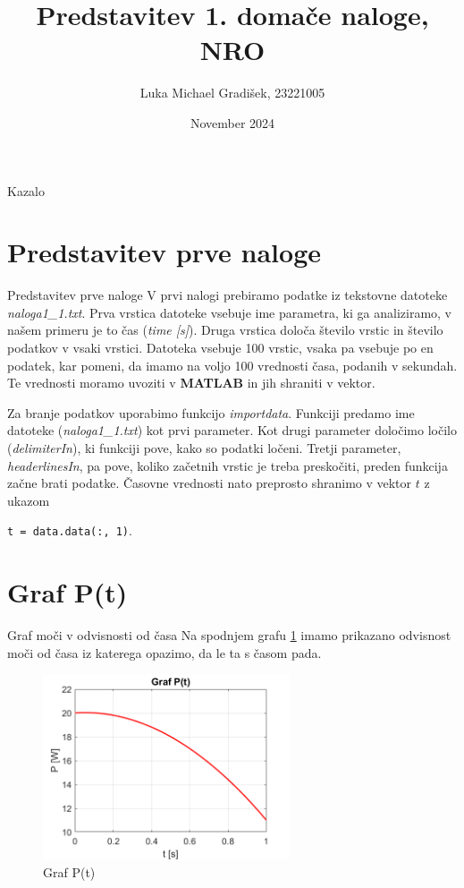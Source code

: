 \documentclass[11pt, aspectration=169]{beamer}
\title{Predstavitev 1. domače naloge, NRO}
\author{Luka Michael Gradišek, 23221005}
\date{November 2024}
\begin{document}
\maketitle

\begin{frame}{Kazalo}
\tableofcontents
\end{frame}

\section{Predstavitev prve naloge}
\begin{frame}{Predstavitev prve naloge}
\justifying
V prvi nalogi prebiramo podatke iz tekstovne datoteke \textit{naloga1\_1.txt}. Prva vrstica datoteke vsebuje ime parametra, ki ga analiziramo, v našem primeru je to čas (\textit{time [s]}). Druga vrstica določa število vrstic in število podatkov v vsaki vrstici. Datoteka vsebuje 100 vrstic, vsaka pa vsebuje po en podatek, kar pomeni, da imamo na voljo 100 vrednosti časa, podanih v sekundah. Te vrednosti moramo uvoziti v \textbf{MATLAB} in jih shraniti v vektor.

Za branje podatkov uporabimo funkcijo \textit{importdata}. Funkciji predamo ime datoteke (\textit{naloga1\_1.txt}) kot prvi parameter. 
Kot drugi parameter določimo ločilo (\textit{delimiterIn}), ki funkciji pove, kako so podatki ločeni. 
Tretji parameter, \textit{headerlinesIn}, pa pove, koliko začetnih vrstic je treba preskočiti, preden funkcija začne brati podatke. 
Časovne vrednosti nato preprosto shranimo v vektor $t$ z ukazom 

\texttt{t = data.data(:, 1)}.
\end{frame}

\section{Graf P(t)}
\begin{frame}{Graf moči v odvisnosti od časa}
Na spodnjem grafu \ref{fig:Graf P(t)} imamo prikazano odvisnost moči od časa iz katerega opazimo, da le ta s časom pada.
\begin{figure}
    \centering
    \includegraphics[width=0.65\textwidth]{graf1.png}
    \caption{Graf P(t)}
    \label{fig:Graf P(t)}
\end{figure}
    
\end{frame}
\end{document}
